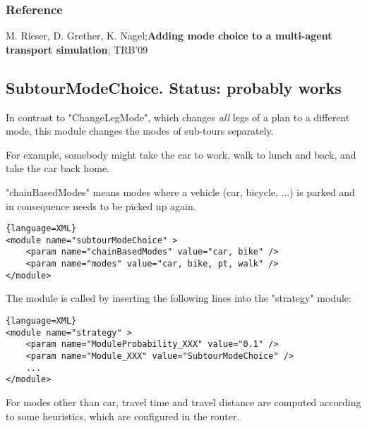 \subsubsection{Reference}

M. Rieser, D. Grether, K. Nagel;\textbf{Adding mode choice to a multi-agent transport simulation}; TRB'09

\subsection{SubtourModeChoice. Status: probably works}


In contrast to "ChangeLegMode", which changes \emph{all} legs of a plan to a different mode, this module changes the modes of sub-tours separately.

For example, somebody might take the car to work, walk to lunch and back, and take the car back home.

"chainBasedModes" means modes where a vehicle (car, bicycle,  ...) is parked and in consequence needs to be picked up again.
\begin{lstlisting}{language=XML}
<module name="subtourModeChoice" >
    <param name="chainBasedModes" value="car, bike" />
    <param name="modes" value="car, bike, pt, walk" />
</module>
\end{lstlisting}


The module is called by inserting the following lines into the "strategy" module:
\begin{lstlisting}{language=XML}
<module name="strategy" >
    <param name="ModuleProbability_XXX" value="0.1" />
    <param name="Module_XXX" value="SubtourModeChoice" />
    ...
</module>
\end{lstlisting}


For modes other than car, travel time and travel distance are  computed according to some heuristics, which are configured in the  router.

\umbruch


